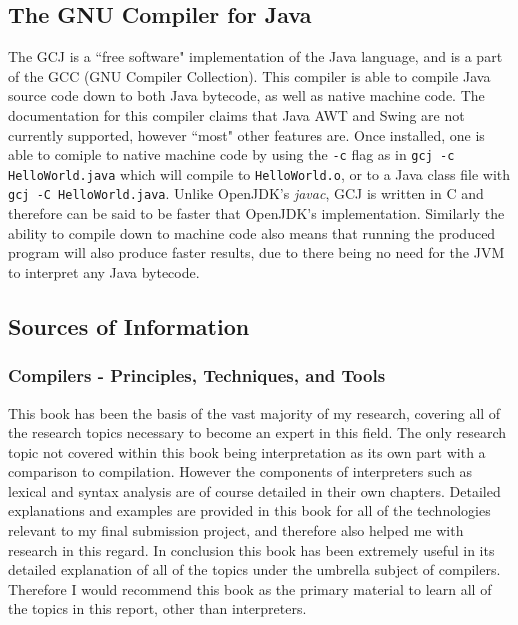 \documentclass[a4paper, 11pt]{article}
\begin{document}
\subsection{The GNU Compiler for Java\cite{GCJ}}
The GCJ is a ``free software" implementation of the Java language, and is a part of the GCC (GNU Compiler Collection). This compiler is able to compile Java source code down to both Java bytecode, as well as native machine code. The documentation for this compiler claims that Java AWT and Swing are not currently supported, however ``most" other features are. Once installed, one is able to  comiple to native machine code by using the \texttt{-c} flag as in \texttt{gcj -c HelloWorld.java} which will compile to \texttt{HelloWorld.o}, or to a Java class file with \texttt{gcj -C HelloWorld.java}. Unlike OpenJDK's \textit{javac}, GCJ is written in C and therefore can be said to be faster that OpenJDK's implementation. Similarly the ability to compile down to machine code also means that running the produced program will also produce faster results, due to there being no need for the JVM to interpret any Java bytecode.

\subsection{Sources of Information}
\subsubsection{Compilers - Principles, Techniques, and Tools \cite{Dragon}}
This book has been the basis of the vast majority of my research, covering all of the research topics necessary to become an expert in this field. The only research topic not covered within this book being interpretation as its own part with a comparison to compilation. However the components of interpreters such as lexical and syntax analysis are of course detailed in their own chapters. Detailed explanations and examples are provided in this book for all of the technologies relevant to my final submission project, and therefore also helped me with research in this regard. In conclusion this book has been extremely useful in its detailed explanation of all of the topics under the umbrella subject of compilers. Therefore I would recommend this book as the primary material to learn all of the topics in this report, other than interpreters.
\end{document}
